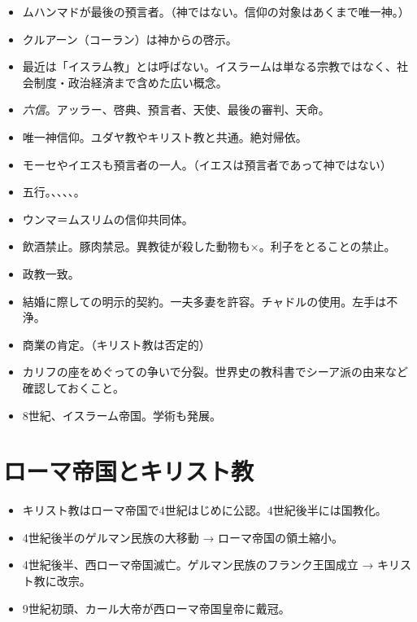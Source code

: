 \documentclass[uplatex,dvipdfmx]{jsarticle} \usepackage{mystyle}%
\begin{document}
\begin{itemize}

\item ムハンマドが最後の預言者。（神ではない。信仰の対象はあくまで唯一神。）
\item クルアーン（コーラン）は神からの啓示。
\item 最近は「イスラム教」とは呼ばない。イスラームは単なる宗教ではなく、社会制度・政治経済まで含めた広い概念。
\item \emph{六信}。アッラー、啓典、預言者、天使、最後の審判、天命。

\item 唯一神信仰。ユダヤ教やキリスト教と共通。絶対帰依。
\item モーセやイエスも預言者の一人。（イエスは預言者であって神ではない）
\item 五行。、、、、。
\item ウンマ＝ムスリムの信仰共同体。
\item 飲酒禁止。豚肉禁忌。異教徒が殺した動物も×。利子をとることの禁止。
\item 政教一致。
\item 結婚に際しての明示的契約。一夫多妻を許容。チャドルの使用。左手は不浄。
\item 商業の肯定。（キリスト教は否定的）
\item カリフの座をめぐっての争いで分裂。世界史の教科書でシーア派の由来など確認しておくこと。
\item 8世紀、イスラーム帝国。学術も発展。
\end{itemize}



\section{ローマ帝国とキリスト教}

\begin{itemize}
\item キリスト教はローマ帝国で4世紀はじめに公認。4世紀後半には国教化。
\item 4世紀後半のゲルマン民族の大移動 → ローマ帝国の領土縮小。
\item 4世紀後半、西ローマ帝国滅亡。ゲルマン民族のフランク王国成立 → キリスト教に改宗。
\item 9世紀初頭、カール大帝が西ローマ帝国皇帝に戴冠。
\end{itemize}
\end{document}
